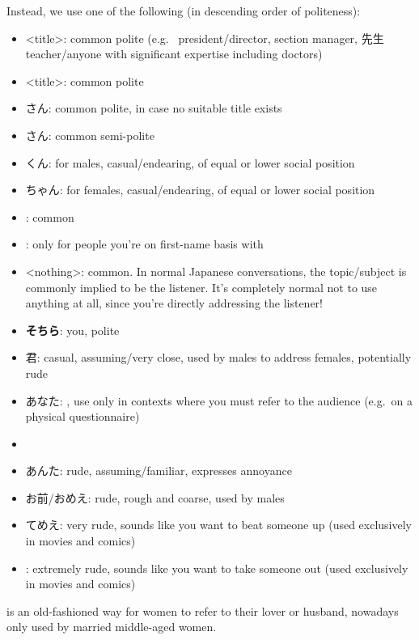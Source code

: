 \documentclass[../nihongo-gakushuu-kyouzai-grammar.tex]{subfiles}
\begin{document}
Instead, we use one of the following (in descending order of politeness):
\begin{itemize}
    \item <title>: common polite (e.g.\  president/director,  section manager, 先生 teacher/anyone with significant expertise including doctors)
    \item <last name><title>: common polite
    \item <last name>さん: common polite, in case no suitable title exists
    \item <first name>さん: common semi-polite
    \item <last name>くん: for males, casual/endearing, of equal or lower social position
    \item <last name>ちゃん: for females, casual/endearing, of equal or lower social position
    \item <last name>: common
    \item <first name>[\{くん, ちゃん\}]: only for people you're on first-name basis with
    \item <nothing>: common. In normal Japanese conversations, the topic/subject is commonly implied to be the listener. It's completely normal not to use anything at all, since you're directly addressing the listener!
    \item \textbf{そちら}: you, polite
    \item 君: casual, assuming/very close, used by males to address females, potentially rude
    \item あなた: , use only in contexts where you must refer to the audience (e.g.\ on a physical questionnaire)
    \item {}
    \item あんた: rude, assuming/familiar, expresses annoyance
    \item お前/おめえ: rude, rough and coarse, used by males
    \item てめえ: very rude, sounds like you want to beat someone up (used exclusively in movies and comics)
    \item {}: extremely rude, sounds like you want to take someone out (used exclusively in movies and comics)
\end{itemize}

 is an old-fashioned way for women to refer to their lover or husband, nowadays only used by married middle-aged women.
\end{document}
